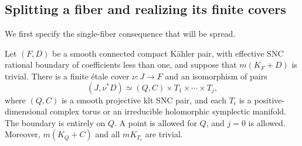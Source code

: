 \subsection{Splitting a fiber and realizing its finite covers}

We first specify the single-fiber consequence that will be spread.

\begin{lemma}\label{spread:fiber-splitting}
Let \((F,D)\) be a smooth connected compact K\"ahler pair, with
effective SNC rational boundary of coefficients less than one, and
suppose that \(m(K_F+D)\) is trivial.  There is a finite \'etale cover
\(\nu:J\to F\) and an isomorphism of pairs
\begin{equation}\label{spread:fiber-product}
 (J,\nu^*D)\simeq (Q,C)\times T_1\times\cdots\times T_j,
\end{equation}
where \((Q,C)\) is a smooth projective klt SNC pair, and each \(T_i\)
is a positive-dimensional complex torus or an irreducible holomorphic
symplectic manifold.  The boundary is entirely on \(Q\).
A point is allowed for \(Q\), and \(j=0\) is allowed.  Moreover,
\(m(K_Q+C)\) and all \(mK_{T_i}\) are trivial.
\end{lemma}

